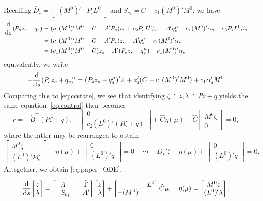\documentclass{article}
\newcommand\diff[2]{\frac{{\rm d}{#1}}{{\rm d}{#2}}}
\begin{document}
Recalling $\bar{D}_s = \begin{bmatrix} (M^0)' & P_s L^0\end{bmatrix}$ and $S_{c_1} = C - c_1 (M^0)' M^0$, we have
\begin{align*}
\diff{}{s} (P_s z_s + q_s) &= (c_1 (M^0)' M^0 - C - A' P_s) z_s + c_2 P_s L^0 \beta_s - A' q^\mu_s - c_1 (M^0)' \alpha_s - c_2 P_s L^0 \beta_s\\
&= (c_1 (M^0)' M^0 - C - A' P_s) z_s - A' q^\mu_s - c_1 (M^0)' \alpha_s\\
&= (c_1 (M^0)' M^0 - C) z_s - A' (P_s z_s + q^\mu_s) - c_1 (M^0)' \alpha_s;
\end{align*}
equivalently, we write
\[
-\diff{}{s} (P_s z_s + q_s)' = (P_s z_s + q^\mu_s)' A + z_s' (C - c_1 (M^0)' M^0) + c_1 \alpha_s' M^0
\]
Comparing this to \eqref{eq:costate}, we see that identifying $\zeta \doteq z, \lambda \doteq P z + q$ yields the same equation. \eqref{eq:control} then becomes
\[
\nu = -\tilde{B}^\top (P \zeta + q), \quad \begin{bmatrix}0 \\ c_2 (L^0)' (P \zeta + q)\end{bmatrix} + \hat{C} \eta(\mu) + \hat{C} \begin{bmatrix}M^0 \zeta \\ 0\end{bmatrix} = 0,
\]
where the latter may be rearranged to obtain
\[
\begin{bmatrix}M^0 \zeta \\ (L^0)' P \zeta\end{bmatrix} - \eta(\mu) + \begin{bmatrix}0 \\ (L^0)' q\end{bmatrix} = 0 \quad \leadsto \quad \bar{D}_s' \zeta - \eta(\mu) + \begin{bmatrix}0 \\ (L^0)' q\end{bmatrix} = 0.
\]
Altogether, we obtain \eqref{eq:paper_ODE}.

\begin{equation}\label{eq:LTI_ODE}
\diff{}{s} \begin{bmatrix}z \\ \lambda\end{bmatrix} = \begin{bmatrix}A & -\tilde{\Gamma}\\-S_{c_1} & -A'\end{bmatrix} \begin{bmatrix}z \\ \lambda\end{bmatrix} + \begin{bmatrix} & L^0 \\-(M^0)'\end{bmatrix}\hat{C} \mu, \quad \eta(\mu) = \begin{bmatrix}M^0 z \\ (L^0)' \lambda\end{bmatrix}.
\end{equation}
\end{document}
